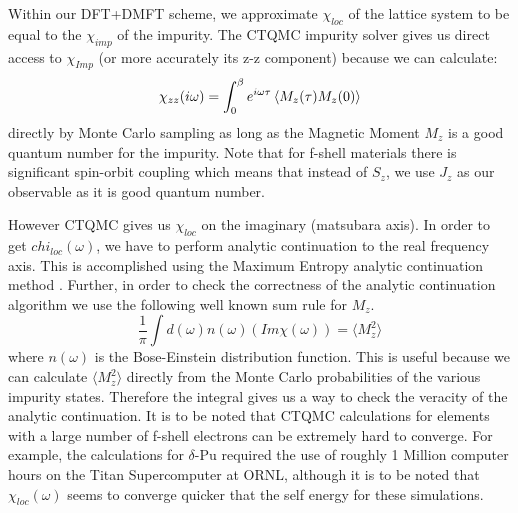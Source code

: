 \documentclass[10pt]{ruthesis}
\begin{document}
{Within our DFT+DMFT scheme, we approximate $\chi_{loc}$ of the lattice system to be equal to the $\chi_{imp}$ of the impurity. The CTQMC impurity solver gives us  direct access to $\chi_{Imp}$ (or more accurately its z-z component) because we can calculate:
\begin{equation}
\chi_{zz}(i\omega)=\int_0^\beta e^{i\omega\tau} \braket{ M_z(\tau)  M_z(0)} 
\end{equation}
directly by Monte Carlo sampling as long as the Magnetic Moment $M_z$ is a good quantum number for the impurity. Note that for f-shell materials there is significant spin-orbit coupling which means that instead of $S_z$, we use $J_z$ as our observable as it is good quantum number. 

However CTQMC gives us $\chi_{loc}$ on the imaginary (matsubara axis). In order to get $chi_{loc}(\omega)$, we have to perform analytic continuation to the real frequency axis. This is accomplished using the Maximum Entropy analytic continuation method  \cite{PhysicsReports_MEM_1996_M.Jarrell}. Further, in order to check the correctness of the analytic continuation algorithm we use the following well known sum rule for $M_z$.
\begin{equation}
\dfrac{1}{\pi}\int d(\omega) n(\omega) (Im \chi(\omega))= \langle M_{z}^{2} \rangle
\end{equation}
where $n(\omega)$ is the Bose-Einstein distribution function. This is useful because we can calculate $\langle M_{z}^{2} \rangle$ directly from the Monte Carlo probabilities of the various impurity states. Therefore the integral gives us a way to check the veracity of the analytic continuation. It is to be noted that CTQMC calculations for elements with a large number of f-shell electrons can be extremely hard to converge. For example, the calculations for $\delta$-Pu required the use of roughly 1 Million computer hours on the Titan Supercomputer at ORNL, although it is to be noted that $\chi_{loc}(\omega)$ seems to converge quicker that the self energy for these simulations.

}
\end{document}
